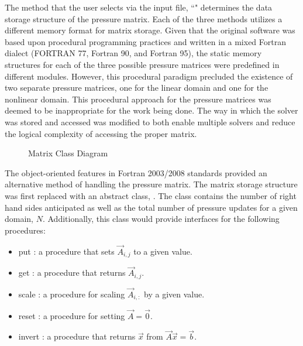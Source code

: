 The method that the user selects via the \cobra{} input file, ``" determines the data storage structure of the pressure matrix.
Each of the three methods utilizes a different memory format for matrix storage.
Given that the original software was based upon procedural programming practices and written in a mixed Fortran dialect (FORTRAN 77, Fortran 90, and Fortran 95), the static memory structures for each of the three possible pressure matrices were predefined in different modules.
However, this procedural paradigm precluded the existence of two separate pressure matrices, one for the linear domain and one for the nonlinear domain.
This procedural approach for the pressure matrices was deemed to be inappropriate for the work being done.
The way in which the solver was stored and accessed was modified to both enable multiple solvers and reduce the logical complexity of accessing the proper matrix.

\begin{figure}[ht!]
\singlespace\centering

\caption{Matrix Class Diagram}
\label{fig:matrixClassDiagram}
\end{figure}

The object-oriented features in Fortran 2003/2008 standards provided an alternative method of handling the pressure matrix.
The matrix storage structure was first replaced with an abstract class, .
The  class contains the number of right hand sides anticipated as well as the total number of pressure updates for a given domain, $N$.
Additionally, this class would provide interfaces for the following procedures:

\begin{itemize}
\item{put : a procedure that sets $\vec{A}_{i,j}$ to a given value.}
\item{get : a procedure that returns $\vec{A}_{i,j}$.}
\item{scale : a procedure for scaling $\vec{A}_{i, :}$ by a given value.}
\item{reset : a procedure for setting $\vec{A} = \vec{0}$.}
\item{invert : a procedure that returns $\vec{x}$ from $\vec{A}\vec{x} = \vec{b}$.}
\end{itemize}

